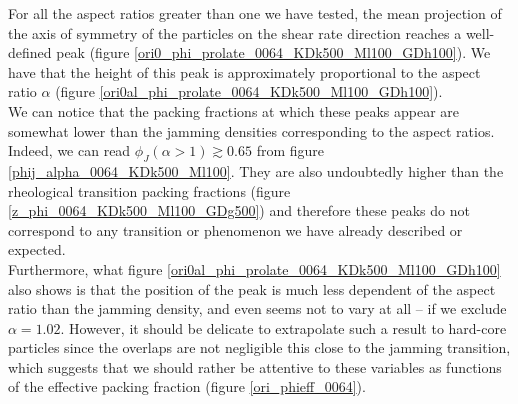 \documentclass[class=report, float=false, crop=false]{standalone}
\begin{document}
For all the aspect ratios greater than one we have tested, the mean projection of the axis of symmetry of the particles on the shear rate direction reaches a well-defined peak (figure \ref{ori0_phi_prolate_0064_KDk500_Ml100_GDh100}). We have that the height of this peak is approximately proportional to the aspect ratio $\alpha$ (figure \ref{ori0al_phi_prolate_0064_KDk500_Ml100_GDh100}).\\

We can notice that the packing fractions at which these peaks appear are somewhat lower than the jamming densities corresponding to the aspect ratios. Indeed, we can read $\phi_J(\alpha>1) \gtrsim 0.65$ from figure \ref{phij_alpha_0064_KDk500_Ml100}. They are also undoubtedly higher than the rheological transition packing fractions (figure \ref{z_phi_0064_KDk500_Ml100_GDg500}) and therefore these peaks do not correspond to any transition or phenomenon we have already described or expected.\\

Furthermore, what figure \ref{ori0al_phi_prolate_0064_KDk500_Ml100_GDh100} also shows is that the position of the peak is much less dependent of the aspect ratio than the jamming density, and even seems not to vary at all -- if we exclude $\alpha=1.02$. However, it should be delicate to extrapolate such a result to hard-core particles since the overlaps are not negligible this close to the jamming transition, which suggests that we should rather be attentive to these variables as functions of the effective packing fraction (figure \ref{ori_phieff_0064}).
\end{document}

